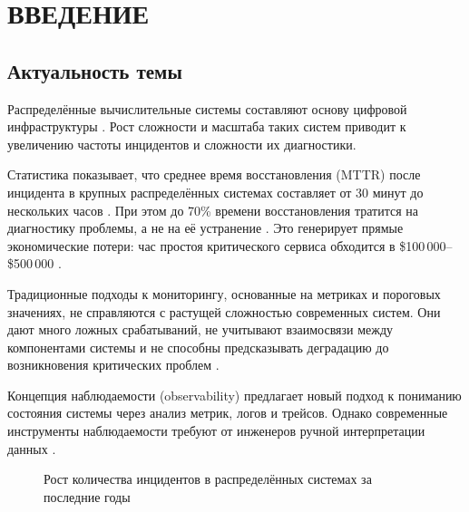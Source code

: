 \chapter*{ВВЕДЕНИЕ}

\section*{Актуальность темы}

Распределённые вычислительные системы составляют основу цифровой инфраструктуры \cite{google_sre_book}. Рост сложности и масштаба таких систем приводит к увеличению частоты инцидентов и сложности их диагностики.

Статистика показывает, что среднее время восстановления (MTTR) после инцидента в крупных распределённых системах составляет от 30 минут до нескольких часов \cite{netflix_chaos}. При этом до 70\% времени восстановления тратится на диагностику проблемы, а не на её устранение \cite{pagerduty_incident_response}. Это генерирует прямые экономические потери: час простоя критического сервиса обходится в \$100\,000--\$500\,000 \cite{amazon_outage_cost}.

Традиционные подходы к мониторингу, основанные на метриках и пороговых значениях, не справляются с растущей сложностью современных систем. Они дают много ложных срабатываний, не учитывают взаимосвязи между компонентами системы и не способны предсказывать деградацию до возникновения критических проблем \cite{charity_majors_observability}.

Концепция наблюдаемости (observability) предлагает новый подход к пониманию состояния системы через анализ метрик, логов и трейсов. Однако современные инструменты наблюдаемости требуют от инженеров ручной интерпретации данных \cite{charity_majors_observability}.

\begin{figure}[H]
\centering
{}
\caption{Рост количества инцидентов в распределённых системах за последние годы \cite{aiops_survey,pagerduty_incident_response}}
\label{fig:incidents_growth}
\end{figure}


